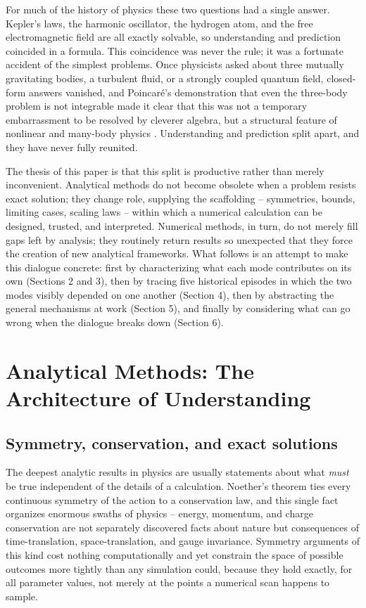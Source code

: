 \documentclass[11pt]{article}
\begin{document}
For much of the history of physics these two questions had a single answer. Kepler's laws, the harmonic oscillator, the hydrogen atom, and the free electromagnetic field are all exactly solvable, so understanding and prediction coincided in a formula. This coincidence was never the rule; it was a fortunate accident of the simplest problems. Once physicists asked about three mutually gravitating bodies, a turbulent fluid, or a strongly coupled quantum field, closed-form answers vanished, and Poincar\'e's demonstration that even the three-body problem is not integrable made it clear that this was not a temporary embarrassment to be resolved by cleverer algebra, but a structural feature of nonlinear and many-body physics \cite{Poincare1890}. Understanding and prediction split apart, and they have never fully reunited.

The thesis of this paper is that this split is productive rather than merely inconvenient. Analytical methods do not become obsolete when a problem resists exact solution; they change role, supplying the scaffolding -- symmetries, bounds, limiting cases, scaling laws -- within which a numerical calculation can be designed, trusted, and interpreted. Numerical methods, in turn, do not merely fill gaps left by analysis; they routinely return results so unexpected that they force the creation of new analytical frameworks. What follows is an attempt to make this dialogue concrete: first by characterizing what each mode contributes on its own (Sections 2 and 3), then by tracing five historical episodes in which the two modes visibly depended on one another (Section 4), then by abstracting the general mechanisms at work (Section 5), and finally by considering what can go wrong when the dialogue breaks down (Section 6).

\section{Analytical Methods: The Architecture of Understanding}

\subsection{Symmetry, conservation, and exact solutions}

The deepest analytic results in physics are usually statements about what \emph{must} be true independent of the details of a calculation. Noether's theorem ties every continuous symmetry of the action to a conservation law, and this single fact organizes enormous swaths of physics -- energy, momentum, and charge conservation are not separately discovered facts about nature but consequences of time-translation, space-translation, and gauge invariance. Symmetry arguments of this kind cost nothing computationally and yet constrain the space of possible outcomes more tightly than any simulation could, because they hold exactly, for all parameter values, not merely at the points a numerical scan happens to sample.
\end{document}
